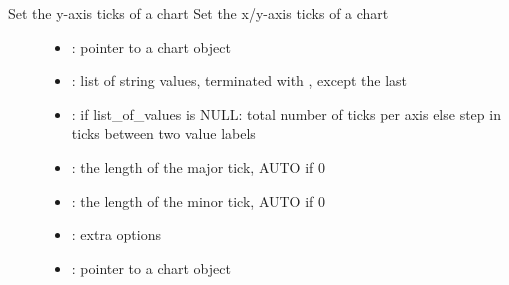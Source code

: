 \documentclass[letterpaper,10pt,english]{sphinxmanual}
\begin{document}
\begin{fulllineitems}
\label{\detokenize{object-types/chart:_CPPv420lv_chart_set_x_ticksP8lv_obj_tPKc7uint8_t7uint8_t7uint8_t23lv_chart_axis_options_t}}%
\pysigstartmultiline
{}\label{\detokenize{object-types/chart:lv__chart_8h_1ad21f2d3672dd9abae4940f5811857750}}%
\pysigstopmultiline
Set the y-axis ticks of a chart 
Set the x/y-axis ticks of a chart 
\begin{description}
\item[{}] \leavevmode\begin{itemize}
\item {} 
: pointer to a chart object 

\item {} 
: list of string values, terminated with 
, except the last 


\item {} 
: if list\_of\_values is NULL: total number of ticks per axis else step in ticks between two value labels 

\item {} 
: the length of the major tick, AUTO if 0 

\item {} 
: the length of the minor tick, AUTO if 0 

\item {} 
: extra options

\end{itemize}

\item[{}] \leavevmode\begin{itemize}
\item {} 
: pointer to a chart object 


\end{itemize}
\end{description}
\end{fulllineitems}
\end{document}
